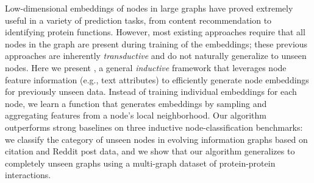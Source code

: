 Low-dimensional embeddings of nodes in large graphs have proved extremely useful in a variety of
prediction tasks, from content recommendation to identifying protein functions. However,
most existing approaches require that all nodes in the graph are present during training of the embeddings; these previous approaches are inherently
{\em transductive} and do not naturally generalize to unseen nodes. 
Here we present \name, a general {\em inductive} framework that leverages node feature information (e.g., text attributes) to efficiently generate node embeddings for previously unseen data.
Instead of training individual embeddings for each node, we learn a function that generates embeddings by sampling and aggregating features from a node's local neighborhood.
Our algorithm outperforms strong baselines on three inductive node-classification benchmarks: we classify the category of unseen nodes in evolving information graphs based on citation and Reddit post data,  and we show that our algorithm generalizes to completely unseen graphs using a multi-graph dataset of protein-protein interactions. 

